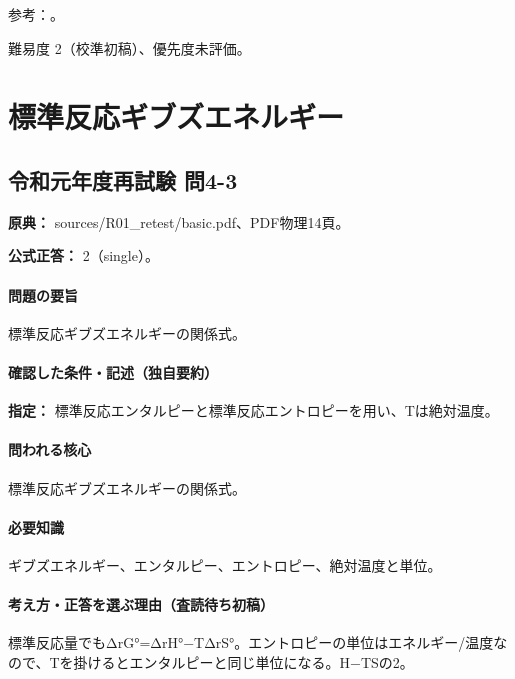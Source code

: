 \par 参考：\cite{iupac_amount_fraction}。

\par 難易度 2（校準初稿）、優先度未評価。

\section{標準反応ギブズエネルギー}

\subsection{令和元年度再試験 問4-3}
\label{q:r01-ret-basic-4-3}

\noindent\textbf{原典：} sources/R01\_retest/basic.pdf、PDF物理14頁。

\textbf{公式正答：} 2（single）。

\paragraph{問題の要旨} 標準反応ギブズエネルギーの関係式。

\paragraph{確認した条件・記述（独自要約）}\mbox{}\par

\noindent\textbf{指定：} 標準反応エンタルピーと標準反応エントロピーを用い、Tは絶対温度。\par

\paragraph{問われる核心} 標準反応ギブズエネルギーの関係式。

\paragraph{必要知識} ギブズエネルギー、エンタルピー、エントロピー、絶対温度と単位。

\paragraph{考え方・正答を選ぶ理由（査読待ち初稿）} 標準反応量でもΔrG°=ΔrH°−TΔrS°。エントロピーの単位はエネルギー/温度なので、Tを掛けるとエンタルピーと同じ単位になる。H−TSの2。

